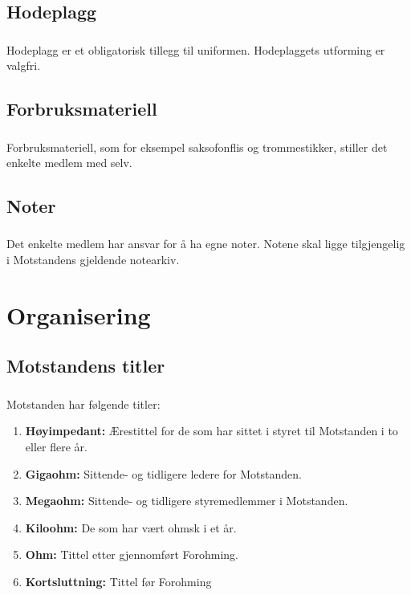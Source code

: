 \documentclass{article}
\newenvironment{statute}[1][]
    {
        \titleformat{\subsubsection}[runin]{\normalfont}{\hspace{1pt}\textit{\S\hspace{5pt}\thesubsubsection}}{0pt}{\rule{4pt}{0pt}}{}
        \subsubsection{}#1
        \begin{minipage}[t]{0.9\linewidth}
    }
    {
        \end{minipage}
        
        \ignorespacesafterend
    }
\begin{document}
        \subsection{Hodeplagg}
            \begin{statute}
                Hodeplagg er et obligatorisk tillegg til uniformen. Hodeplaggets utforming er valgfri.
            \end{statute}
            
        \subsection{Forbruksmateriell}
            \begin{statute}
                Forbruksmateriell, som for eksempel saksofonflis og trommestikker, stiller det enkelte medlem med selv.
            \end{statute}
            
        \subsection{Noter}
            \begin{statute}
                Det enkelte medlem har ansvar for å ha egne noter. Notene skal ligge tilgjengelig i Motstandens gjeldende notearkiv.
            \end{statute}
            
    \section{Organisering}
        \subsection{Motstandens titler}
            \begin{statute}
                Motstanden har følgende titler:
                \begin{enumerate}[font = \bfseries]
                    \item \textbf{Høyimpedant:} Ærestittel for de som har sittet i styret til Motstanden i to eller flere år.
                    \item \textbf{Gigaohm:} Sittende- og tidligere ledere for Motstanden.
                    \item \textbf{Megaohm:} Sittende- og tidligere styremedlemmer i Motstanden.
                    \item \textbf{Kiloohm:} De som har vært ohmsk i et år.
                    \item \textbf{Ohm:} Tittel etter gjennomført Forohming.
                    \item \textbf{Kortsluttning:} Tittel før Forohming
                \end{enumerate}
            \end{statute}
            
\end{document}

